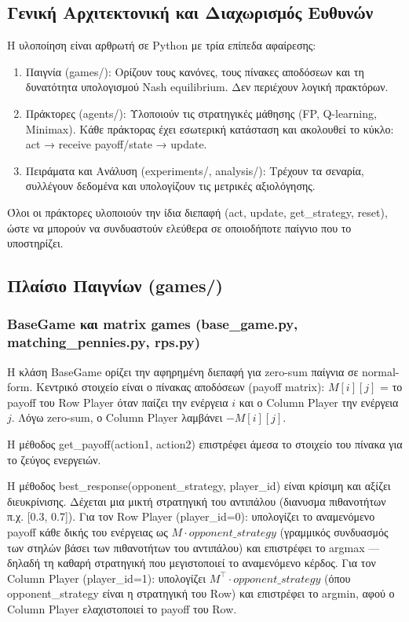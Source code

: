 \documentclass[11pt,a4paper]{article}
\newcommand{\eng}[1]{\foreignlanguage{english}{#1}}
\begin{document}
\subsection{Γενική Αρχιτεκτονική και Διαχωρισμός Ευθυνών}

Η υλοποίηση είναι αρθρωτή σε Python με τρία επίπεδα αφαίρεσης:

\begin{enumerate}
\item Παιγνία (\eng{games/}): Ορίζουν τους κανόνες, τους πίνακες αποδόσεων και τη δυνατότητα υπολογισμού Nash equilibrium. Δεν περιέχουν λογική πρακτόρων.

\item Πράκτορες (\eng{agents/}): Υλοποιούν τις στρατηγικές μάθησης (FP, Q-learning, Minimax). Κάθε πράκτορας έχει εσωτερική κατάσταση και ακολουθεί το κύκλο: act → receive payoff/state → update.

\item Πειράματα και Ανάλυση (\eng{experiments/}, \eng{analysis/}): Τρέχουν τα σεναρία, συλλέγουν δεδομένα και υπολογίζουν τις μετρικές αξιολόγησης.
\end{enumerate}

Όλοι οι πράκτορες υλοποιούν την ίδια διεπαφή (act, update, get\_strategy, reset), ώστε να μπορούν να συνδυαστούν ελεύθερα σε οποιοδήποτε παίγνιο που το υποστηρίζει.

\subsection{Πλαίσιο Παιγνίων (\eng{games/})}

\subsubsection{BaseGame και matrix games (\eng{base\_game.py}, \eng{matching\_pennies.py}, \eng{rps.py})}

Η κλάση \eng{BaseGame} ορίζει την αφηρημένη διεπαφή για zero-sum παίγνια σε normal-form. Κεντρικό στοιχείο είναι ο πίνακας αποδόσεων (payoff matrix): \(M[i][j]\) = το payoff του Row Player όταν παίζει την ενέργεια \(i\) και ο Column Player την ενέργεια \(j\). Λόγω zero-sum, ο Column Player λαμβάνει \(-M[i][j]\).

Η μέθοδος \eng{get\_payoff(action1, action2)} επιστρέφει άμεσα το στοιχείο του πίνακα για το ζεύγος ενεργειών.

Η μέθοδος \eng{best\_response(opponent\_strategy, player\_id)} είναι κρίσιμη και αξίζει διευκρίνισης. Δέχεται μια μικτή στρατηγική του αντιπάλου (διανυσμα πιθανοτήτων π.χ. [0.3, 0.7]). Για τον Row Player (player\_id=0): υπολογίζει το αναμενόμενο payoff κάθε δικής του ενέργειας ως \(M \cdot \textit{opponent\_strategy}\) (γραμμικός συνδυασμός των στηλών βάσει των πιθανοτήτων του αντιπάλου) και επιστρέφει το argmax — δηλαδή τη καθαρή στρατηγική που μεγιστοποιεί το αναμενόμενο κέρδος. Για τον Column Player (player\_id=1): υπολογίζει \(M^\top \cdot \textit{opponent\_strategy}\) (όπου opponent\_strategy είναι η στρατηγική του Row) και επιστρέφει το argmin, αφού ο Column Player ελαχιστοποιεί το payoff του Row.
\end{document}
